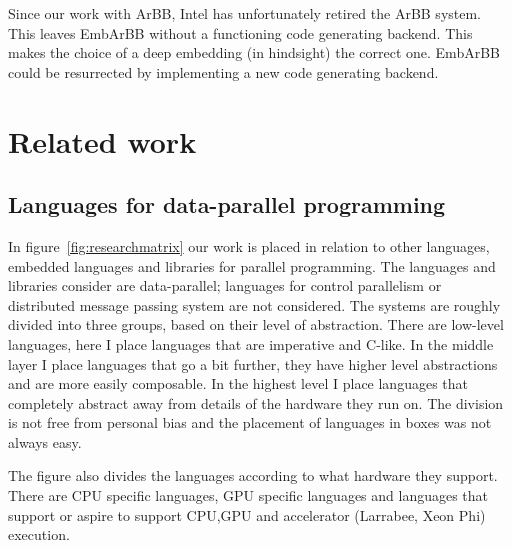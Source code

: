 \documentclass[a4paper]{book}
\begin{document}
Since our work with ArBB, Intel has unfortunately retired the ArBB system. This 
leaves EmbArBB without a functioning code generating backend. This makes the choice of a
deep embedding (in hindsight) the correct one. EmbArBB could be resurrected by implementing 
a new code generating backend. 


%
%
\section{Related work} 
\label{sec:relatedwork}
\FloatBarrier


\subsection{Languages for data-parallel programming}

In figure~\ref{fig:researchmatrix} our work is placed in relation to other languages,
embedded languages and libraries for parallel programming. The languages and libraries consider 
are data-parallel; languages for control parallelism or distributed message passing system are 
not considered. The systems are roughly divided 
into three groups, based on their level of abstraction. There are low-level languages, here 
I place languages that are imperative and C-like. In the middle layer I place languages 
that go a bit further, they have higher level abstractions and are more easily composable. 
In the highest level I place languages that completely abstract away from details of the 
hardware they run on. The division is not free from personal bias and the placement of languages
in boxes was not always easy. 

The figure also divides the languages according to what hardware they support. There 
are CPU specific languages, GPU specific languages and languages that support or aspire 
to support CPU,GPU and accelerator (Larrabee, Xeon Phi) execution. 
\end{document}

